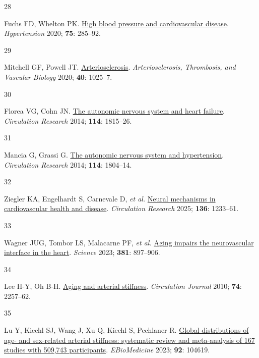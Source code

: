 \documentclass[
  a4paper,
  headsepline=true,
  open=any]{scrbook}
\newlength{\cslhangindent}
\newlength{\csllabelwidth}
\newlength{\cslentryspacingunit} %
\newenvironment{CSLReferences}[2] %
 {%
  \setlength{\parindent}{0pt}
  \ifodd #1
  \let\oldpar\par
  \def\par{\hangindent=\cslhangindent\oldpar}
  \fi
  \setlength{\parskip}{#2\cslentryspacingunit}
 }%
 {}
\newcommand{\CSLLeftMargin}[1]{\parbox[t]{\csllabelwidth}{#1}}
\newcommand{\CSLRightInline}[1]{\parbox[t]{\linewidth - \csllabelwidth}{#1}\break}
\begin{document}
\begin{CSLReferences}{0}{0}
\leavevmode{}%
\CSLLeftMargin{28 }%
\CSLRightInline{Fuchs FD, Whelton PK.
\href{https://doi.org/10.1161/HYPERTENSIONAHA.119.14240}{High blood
pressure and cardiovascular disease}. \emph{Hypertension} 2020;
\textbf{75}: 285--92.}

\leavevmode{}%
\CSLLeftMargin{29 }%
\CSLRightInline{Mitchell GF, Powell JT.
\href{https://doi.org/10.1161/ATVBAHA.120.314208}{Arteriosclerosis}.
\emph{Arteriosclerosis, Thrombosis, and Vascular Biology} 2020;
\textbf{40}: 1025--7.}

\leavevmode{}%
\CSLLeftMargin{30 }%
\CSLRightInline{Florea VG, Cohn JN.
\href{https://doi.org/10.1161/CIRCRESAHA.114.302589}{The autonomic
nervous system and heart failure}. \emph{Circulation Research} 2014;
\textbf{114}: 1815--26.}

\leavevmode{}%
\CSLLeftMargin{31 }%
\CSLRightInline{Mancia G, Grassi G.
\href{https://doi.org/10.1161/CIRCRESAHA.114.302524}{The autonomic
nervous system and hypertension}. \emph{Circulation Research} 2014;
\textbf{114}: 1804--14.}

\leavevmode{}%
\CSLLeftMargin{32 }%
\CSLRightInline{Ziegler KA, Engelhardt S, Carnevale D, \emph{et al.}
\href{https://doi.org/10.1161/CIRCRESAHA.125.325580}{Neural mechanisms
in cardiovascular health and disease}. \emph{Circulation Research} 2025;
\textbf{136}: 1233--61.}

\leavevmode{}%
\CSLLeftMargin{33 }%
\CSLRightInline{Wagner JUG, Tombor LS, Malacarne PF, \emph{et al.}
\href{https://doi.org/10.1126/science.ade4961}{Aging impairs the
neurovascular interface in the heart}. \emph{Science} 2023;
\textbf{381}: 897--906.}

\leavevmode{}%
\CSLLeftMargin{34 }%
\CSLRightInline{Lee H-Y, Oh B-H.
\href{https://doi.org/10.1253/circj.CJ-10-0910}{Aging and arterial
stiffness}. \emph{Circulation Journal} 2010; \textbf{74}: 2257--62.}

\leavevmode{}%
\CSLLeftMargin{35 }%
\CSLRightInline{Lu Y, Kiechl SJ, Wang J, Xu Q, Kiechl S, Pechlaner R.
\href{https://doi.org/10.1016/j.ebiom.2023.104619}{Global distributions
of age- and sex-related arterial stiffness: systematic review and
meta-analysis of 167 studies with 509,743 participants}.
\emph{EBioMedicine} 2023; \textbf{92}: 104619.}


\end{CSLReferences}
\end{document}
